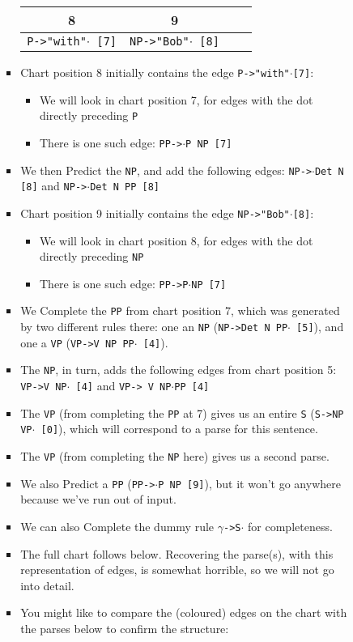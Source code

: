 \documentclass[a4paper]{article}
\begin{document}
\begin{enumerate}
\begin{enumerate}
\begin{enumerate}
\begin{itemize}
\begin{table}[ht]
\begin{tabular}{l|l|l|l}
\hline
\multicolumn{1}{c}{8} & \multicolumn{1}{c}{9} & \multicolumn{1}{c}{} & \\
\hline
\texttt{P->"with"}$\cdot$\texttt{ [7]} & \texttt{NP->"Bob"}$\cdot$\texttt{ [8]} & & \\
\hline
\end{tabular}
\end{table}
\item Chart position 8 initially contains the edge \texttt{P->"with"}$\cdot$\texttt{[7]}:
\begin{itemize}
\item We will look in chart position 7, for edges with the dot directly preceding \texttt{P}
\item There is one such edge: \texttt{PP->}$\cdot$\texttt{P NP [7]}
\end{itemize}
\item We then Predict the \texttt{NP}, and add the following edges: \texttt{NP->}$\cdot$\texttt{Det N [8]} and \texttt{NP->}$\cdot$\texttt{Det N PP [8]}
\item Chart position 9 initially contains the edge \texttt{NP->"Bob"}$\cdot$\texttt{[8]}:
\begin{itemize}
\item We will look in chart position 8, for edges with the dot directly preceding \texttt{NP}
\item There is one such edge: \texttt{PP->P}$\cdot$\texttt{NP [7]}
\end{itemize}
\item We Complete the \texttt{PP} from chart position 7, which was generated by two different rules there: one an \texttt{NP} (\texttt{NP->Det N PP}$\cdot$\texttt{ [5]}), and one a \texttt{VP} (\texttt{VP->V NP PP}$\cdot$\texttt{ [4]}).
\item The \texttt{NP}, in turn, adds the following edges from chart position 5: \texttt{VP->V NP}$\cdot$\texttt{ [4]} and \texttt{VP-> V NP}$\cdot$\texttt{PP [4]}
\item The \texttt{VP} (from completing the \texttt{PP} at 7) gives us an entire \texttt{S} (\texttt{S->NP VP}$\cdot$\texttt{ [0]}), which will correspond to a parse for this sentence.
\item The \texttt{VP} (from completing the \texttt{NP} here) gives us a second parse.
\item We also Predict a \texttt{PP} (\texttt{PP->}$\cdot$\texttt{P NP [9]}), but it won't go anywhere because we've run out of input.
\item We can also Complete the dummy rule $\gamma$\texttt{->S}$\cdot$ for completeness.
\item The full chart follows below. Recovering the parse(s), with this representation of edges, is somewhat horrible, so we will not go into detail.
\item You might like to compare the (coloured) edges on the chart with the parses below to confirm the structure:
\end{itemize}
\end{enumerate}
\end{enumerate}


\end{enumerate}
\end{document}
